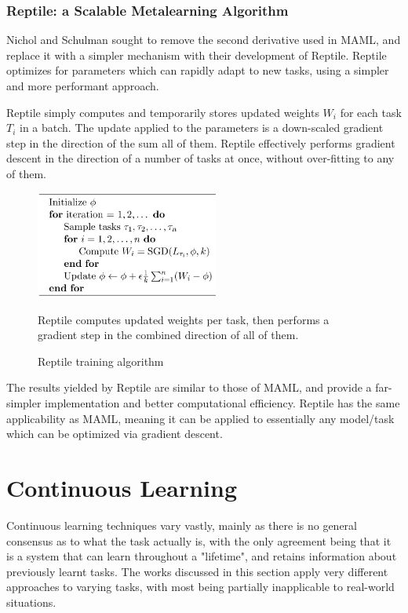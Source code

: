 \documentclass{report}
\begin{document}
\subsubsection{Reptile: a Scalable Metalearning Algorithm}
Nichol and Schulman \parencite{reptile} sought to remove the second derivative used in MAML, and replace it with a simpler mechanism with their development of Reptile. Reptile optimizes for parameters which can rapidly adapt to new tasks, using a simpler and more performant approach. \par
Reptile simply computes and temporarily stores updated weights $W_i$ for each task $T_i$ in a batch. The update applied to the parameters is a down-scaled gradient step in the direction of the sum all of them. Reptile effectively performs gradient descent in the direction of a number of tasks at once, without over-fitting to any of them.
\begin{figure}[h]
 \centering
 \includegraphics[width=6cm]{reptilealgo}
 \caption{Reptile training algorithm}
 Reptile computes updated weights per task, then performs a gradient step in the combined direction of all of them.
 \label{fig:reptile-algo:1}
\end{figure}
The results yielded by Reptile are similar to those of MAML, and provide a far-simpler implementation and better computational efficiency. Reptile has the same applicability as MAML, meaning it can be applied to essentially any model/task which can be optimized via gradient descent.


\section{Continuous Learning} \label{related-cont-learning:1}
Continuous learning techniques vary vastly, mainly as there is no general consensus as to what the task actually is, with the only agreement being that it is a system that can learn throughout a "lifetime", and retains information about previously learnt tasks. The works discussed in this section apply very different approaches to varying tasks, with most being partially inapplicable to real-world situations.
\end{document}
